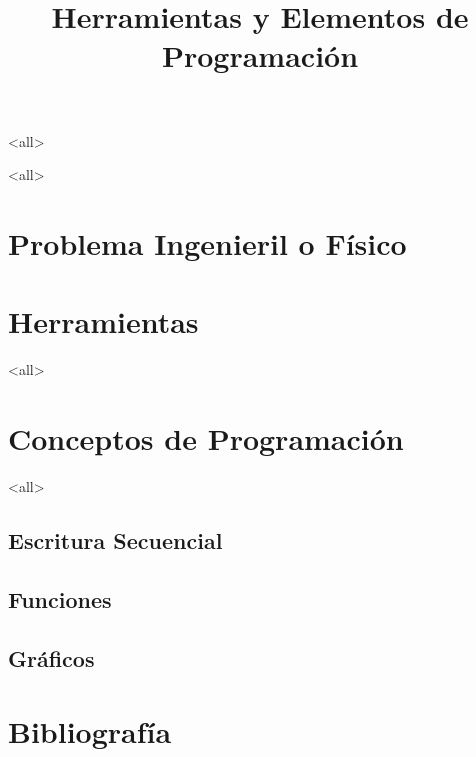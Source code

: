 \mode<all>









\title{
    Herramientas y Elementos de Programación}
\subject{Introducción a la Materia. Repaso de elementos de Programación.}





\mode<all>

\section{Problema Ingenieril o Físico}



\section{Herramientas}



\mode<all>
\section{Conceptos de Programación}


\mode<all>


\subsection{Escritura Secuencial}

\subsection{Funciones}

\subsection{Gráficos}

\section{Bibliografía}


